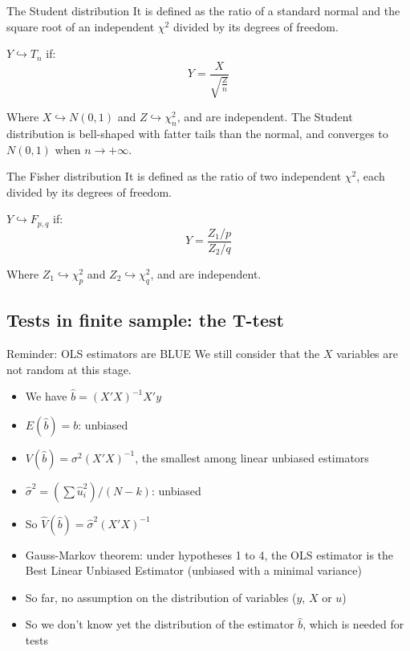 \documentclass[aspectratio=169]{beamer}
\begin{document}
\begin{frame}{The Student distribution}
It is defined as the ratio of a standard normal and the square root of an independent $\chi^2$ divided by its degrees of freedom.

$Y \hookrightarrow T_n$ if:
\[
Y = \frac{X}{\sqrt{\frac{Z}{n}}}
\]

Where $X \hookrightarrow N(0,1)$ and $Z \hookrightarrow \chi_n^2$, and are independent. The Student distribution is bell-shaped with fatter tails than the normal, and converges to $N(0,1)$ when $n \to +\infty$.
\end{frame}

\begin{frame}{The Fisher distribution}
It is defined as the ratio of two independent $\chi^2$, each divided by its degrees of freedom.

$Y \hookrightarrow F_{p,q}$ if:
\[
Y = \frac{Z_1/p}{Z_2/q}
\]

Where $Z_1 \hookrightarrow \chi_p^2$ and $Z_2 \hookrightarrow \chi_q^2$, and are independent.
\end{frame}

\subsection{Tests in finite sample: the T-test}

\begin{frame}{Reminder: OLS estimators are BLUE}
We still consider that the $X$ variables are not random at this stage.

\begin{itemize}
    \item We have $\hat{b} = (X'X)^{-1}X'y$
    \item $E(\hat{b}) = b$: unbiased
    \item $V(\hat{b}) = \sigma^2(X'X)^{-1}$, the smallest among linear unbiased estimators
    \item $\hat{\sigma}^2 = (\sum \hat{u}_i^2)/(N-k)$: unbiased
    \item So $\hat{V}(\hat{b}) = \hat{\sigma}^2(X'X)^{-1}$
    \item Gauss-Markov theorem: under hypotheses 1 to 4, the OLS estimator is the Best Linear Unbiased Estimator (unbiased with a minimal variance)
    \item So far, no assumption on the distribution of variables ($y$, $X$ or $u$)
    \item So we don't know yet the distribution of the estimator $\hat{b}$, which is needed for tests
\end{itemize}
\end{frame}
\end{document}
